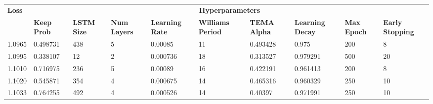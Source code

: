 \documentclass[12pt,a4paper,twoside,openright]{report}
\begin{document}
\begin{table}
\centering
\begin{tabular}{p{1.6cm}|p{1.8cm}p{1.7cm}p{1.9cm}p{1.9cm}p{1.9cm}p{1.9cm}p{1.9cm}p{1.7cm}p{1.9cm}}
\toprule
\textbf{Loss} & \multicolumn{9}{c}{\textbf{Hyperparameters} } \bigstrut\\
	&\textbf{Keep Prob} & \textbf{LSTM Size} & \textbf{Num Layers} & \textbf{Learning Rate} & \textbf{Williams Period} & \textbf{TEMA Alpha} & \textbf{Learning Decay} & \textbf{Max Epoch} & \textbf{Early Stopping}  \bigstrut\\ \hline
1.0965				&0.498731                               & 438                                    & 5                                       & 0.00085                                         & 11                                           & 0.493428                                & 0.975                                       & 200                                    & 8                                            \bigstrut\\
1.0995				&0.338107                               & 12                                     & 2                                       & 0.000736                                        & 18                                           & 0.313527                                & 0.979291                                    & 500                                    & 20                                           \bigstrut\\
1.1010				&0.716975                               & 236                                    & 5                                       & 0.00089                                         & 16                                           & 0.422191                                & 0.961413                                    & 200                                    & 8                                            \bigstrut\\
1.1020				&0.545871                               & 354                                    & 4                                       & 0.000675                                        & 14                                           & 0.465316                                & 0.960329                                    & 250                                    & 10                                           \bigstrut\\
1.1033				&0.764255                               & 492                                    & 4                                       & 0.000526                                        & 14                                           & 0.40397                                 & 0.971991                                    & 250                                    & 10                                           \bigstrut\\

\end{tabular}
\end{table}
\end{document}
